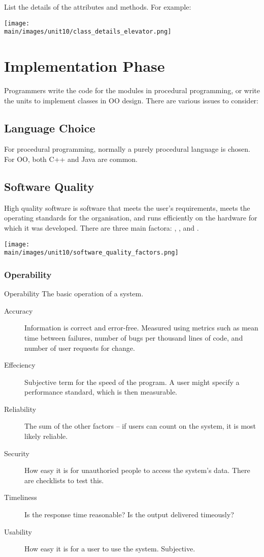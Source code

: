 \documentclass[\main/notes.tex]{subfiles}
\begin{document}
				List the details of the attributes and methods. For example:
				\begin{center}
					\texttt{[image: \\main/images/unit10/class\_details\_elevator.png]}
				\end{center}

		\section{Implementation Phase}
			Programmers write the code for the modules in procedural programming, or write the units to implement classes in OO design. There are various issues to consider:
			\subsection{Language Choice}
				For procedural programming, normally a purely procedural language is chosen. For OO, both C++ and Java are common.
			\subsection{Software Quality}
				High quality software is software that meets the user's requirements, meets the operating standards for the organisation, and runs efficiently on the hardware for which it was developed. There are three main factora: , , and .
				\begin{center}
					\texttt{[image: \\main/images/unit10/software\_quality\_factors.png]}
				\end{center}
				\subsubsection{Operability}
					\begin{definition}{Operability}
						The basic operation of a system.
					\end{definition}
					\begin{description}
						\item[Accuracy] Information is correct and error-free. Measured using metrics such as mean time between failures, number of bugs per thousand lines of code, and number of user requests for change.
						\item[Effeciency] Subjective term for the speed of the program. A user might specify a performance standard, which is then measurable.
						\item[Reliability] The sum of the other factors -- if users can count on the system, it is most likely reliable.
						\item[Security] How easy it is for unauthoried people to access the system's data. There are checklists to test this.
						\item[Timeliness] Is the response time reasonable? Is the output delivered timeously?
						\item[Usability] How easy it is for a user to use the system. Subjective.
					\end{description}
\end{document}
